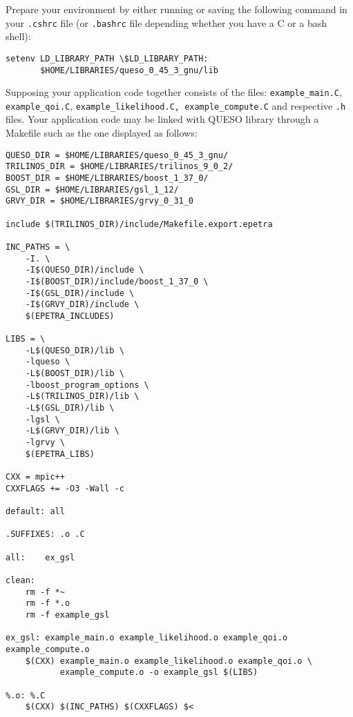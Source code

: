 Prepare your environment by either running or saving the following command in your \verb+.cshrc+ file (or \verb+.bashrc+ file depending whether you have a C or a bash shell):

\begin{lstlisting}[label={},caption={}]
setenv LD_LIBRARY_PATH \$LD_LIBRARY_PATH:
       $HOME/LIBRARIES/queso_0_45_3_gnu/lib
\end{lstlisting}


Supposing your application code together consists of the files: \linebreak \verb+example_main.C+, \verb+example_qoi.C+,  \verb+example_likelihood.C, example_compute.C+ and respective \verb+.h+ files. Your application code may be linked with QUESO library through a Makefile such as the one displayed as follows:

\begin{lstlisting}[label={},caption={},deletekeywords={export,rm}]
QUESO_DIR = $HOME/LIBRARIES/queso_0_45_3_gnu/
TRILINOS_DIR = $HOME/LIBRARIES/trilinos_9_0_2/
BOOST_DIR = $HOME/LIBRARIES/boost_1_37_0/
GSL_DIR = $HOME/LIBRARIES/gsl_1_12/
GRVY_DIR = $HOME/LIBRARIES/grvy_0_31_0

include $(TRILINOS_DIR)/include/Makefile.export.epetra

INC_PATHS = \
	-I. \
	-I$(QUESO_DIR)/include \
	-I$(BOOST_DIR)/include/boost_1_37_0 \
	-I$(GSL_DIR)/include \
	-I$(GRVY_DIR)/include \
	$(EPETRA_INCLUDES)

LIBS = \
	-L$(QUESO_DIR)/lib \
	-lqueso \
	-L$(BOOST_DIR)/lib \
	-lboost_program_options \
	-L$(TRILINOS_DIR)/lib \
	-L$(GSL_DIR)/lib \
	-lgsl \
	-L$(GRVY_DIR)/lib \
	-lgrvy \
	$(EPETRA_LIBS)

CXX = mpic++
CXXFLAGS += -O3 -Wall -c

default: all

.SUFFIXES: .o .C

all:	ex_gsl

clean:
	rm -f *~
	rm -f *.o
	rm -f example_gsl

ex_gsl: example_main.o example_likelihood.o example_qoi.o example_compute.o
	$(CXX) example_main.o example_likelihood.o example_qoi.o \
	       example_compute.o -o example_gsl $(LIBS)

%.o: %.C
	$(CXX) $(INC_PATHS) $(CXXFLAGS) $<
\end{lstlisting}
% 
